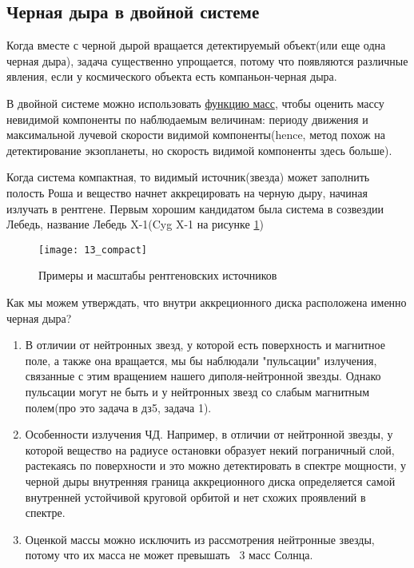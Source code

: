 \subsection{Черная дыра в двойной системе}

Когда вместе с черной дырой вращается детектируемый объект(или еще одна черная дыра), задача существенно упрощается, потому что появляются различные явления, если у космического объекта есть компаньон-черная дыра.

В двойной системе можно использовать \href{https://en.wikipedia.org/wiki/Binary_mass_function}{функцию масс}, чтобы оценить массу невидимой компоненты по наблюдаемым величинам: периоду движения и максимальной лучевой скорости видимой компоненты(hence, метод похож на детектирование экзопланеты, но скорость видимой компоненты здесь больше).

Когда система компактная, то видимый источник(звезда) может заполнить полость Роша и вещество начнет аккрецировать на черную дыру, начиная излучать в рентгене. Первым хорошим кандидатом была система в созвездии Лебедь, название Лебедь X-1(Cyg X-1 на рисунке \ref{fig:13_compact})

\begin{figure}[H]
	\centering
	\texttt{[image: 13\_compact]}
	\caption{Примеры и масштабы рентгеновских источников}
	\label{fig:13_compact}
\end{figure}

Как мы можем утверждать, что внутри аккреционного диска расположена именно черная дыра?

\begin{enumerate}
	\item В отличии от нейтронных звезд, у которой есть поверхность и магнитное поле, а также она вращается, мы бы наблюдали "пульсации" излучения, связанные с этим вращением нашего диполя-нейтронной звезды. Однако пульсации могут не быть и у нейтронных звезд со слабым магнитным полем(про это задача в дз5, задача 1).
	\item Особенности излучения ЧД. Например, в отличии от нейтронной звезды, у которой вещество на радиусе остановки образует некий пограничный слой, растекаясь по поверхности и это можно детектировать в спектре мощности, у черной дыры внутренняя граница аккреционного диска определяется самой внутренней устойчивой круговой орбитой и нет схожих проявлений в спектре.
	\item Оценкой массы можно исключить из рассмотрения нейтронные звезды, потому что их масса не может превышать ~3 масс Солнца.
\end{enumerate}

